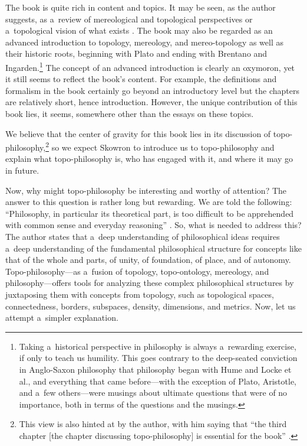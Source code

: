 The book is quite rich in content and topics. It may be seen, as the author suggests, as a~review of mereological and topological perspectives 
\parencite[][p.xi]{skowron_czesc_2021} %
 or a~topological vision of what exists 
\parencite[][p.xi]{skowron_czesc_2021}. %
 The book may also be regarded as an advanced introduction to topology, mereology, and mereo-topology as well as their historic roots, beginning with Plato and ending with Brentano and Ingarden.\footnote{Taking a~historical perspective in philosophy is always a~rewarding exercise, if only to teach us humility. This goes contrary to the deep-seated conviction in Anglo-Saxon philosophy that philosophy began with Hume and Locke et al., and everything that came before---with the exception of Plato, Aristotle, and a~few others---were musings about ultimate questions that were of no importance, both in terms of the questions and the musings.} The concept of an advanced introduction is clearly an oxymoron, yet it still seems to reflect the book's content. For example, the definitions and formalism in the book certainly go beyond an introductory level but the chapters are relatively short, hence introduction. However, the unique contribution of this book lies, it seems, somewhere other than the essays on these topics.



We believe that the center of gravity for this book lies in its discussion of topo-philosophy,\footnote{This view is also hinted at by the author, with him saying that ``the third chapter [the chapter discussing topo-philosophy] is essential for the book'' 
\parencite[][p.xix]{skowron_czesc_2021}.%
} so we expect Skowron to introduce us to topo-philosophy and explain what topo-philosophy is, who has engaged with it, and where it may go in future.



Now, why might topo-philosophy be interesting and worthy of attention? The answer to this question is rather long but rewarding. We are told the following: ``Philosophy, in particular its theoretical part, is too difficult to be apprehended with common sense and everyday reasoning'' 
\parencite[][p.xvi]{skowron_czesc_2021}. %
 So, what is needed to address this? The author states that a~deep understanding of philosophical ideas requires a~deep understanding of the fundamental philosophical structure for concepts like that of the whole and parts, of unity, of foundation, of place, and of autonomy. Topo-philosophy---as a~fusion of topology, topo-ontology, mereology, and philosophy---offers tools for analyzing these complex philosophical structures by juxtaposing them with concepts from topology, such as topological spaces, connectedness, borders, subspaces, density, dimensions, and metrics. Now, let us attempt a~simpler explanation.



